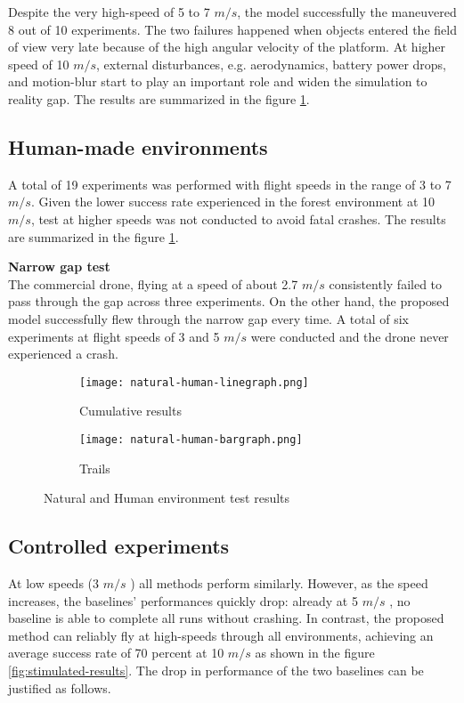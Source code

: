 Despite the very high-speed of 5 to 7 $m/s$, the model successfully the maneuvered 8 out of 10 experiments. The two failures happened when objects entered the field of view very late because of the high angular velocity of the platform. At higher speed of 10 $m/s$, external disturbances, e.g. aerodynamics, battery power drops, and motion-blur start to play an important role and widen the simulation to reality gap. The results are summarized in the figure \ref{fig:natual-human-result}.

\subsection{Human-made environments}
A total of 19 experiments was performed with flight speeds in the range of 3 to 7 $m/s$. Given the lower success rate experienced in the forest environment at 10 $m/s$, test at higher speeds was not conducted to avoid fatal crashes. The results are summarized in the figure \ref{fig:natual-human-result}. 

\textbf{Narrow gap test}\\
The commercial drone, flying at a speed of about 2.7 $m/s$ consistently failed to pass through the gap across three experiments. On the other hand, the proposed model successfully flew through the narrow gap every time. A total of six experiments at flight speeds of 3 and 5 $m/s$ were conducted and the drone never experienced a crash.

\begin{figure}[!h]
	\begin{subfigure}[b]{0.38\textwidth}
		\centering
		\texttt{[image: natural-human-linegraph.png]}
		\caption{Cumulative results}
	\end{subfigure}
	\hfill
	\begin{subfigure}[b]{0.58\textwidth}
		\centering
		\texttt{[image: natural-human-bargraph.png]}
		\caption{Trails}
	\end{subfigure}
	\caption{Natural and Human environment test results}
	\label{fig:natual-human-result}
\end{figure}

\subsection{Controlled experiments}
At low speeds (3 $m/s$ ) all methods perform similarly. However, as the speed increases, the baselines’ performances quickly drop: already at 5 $m/s$ , no baseline is able to complete all runs without crashing. In contrast, the proposed method can reliably fly at high-speeds through all environments, achieving an average success rate of 70 percent at 10 $m/s$ as shown in the figure \ref{fig:stimulated-results}. The drop in performance of the two baselines can be justified as follows.

